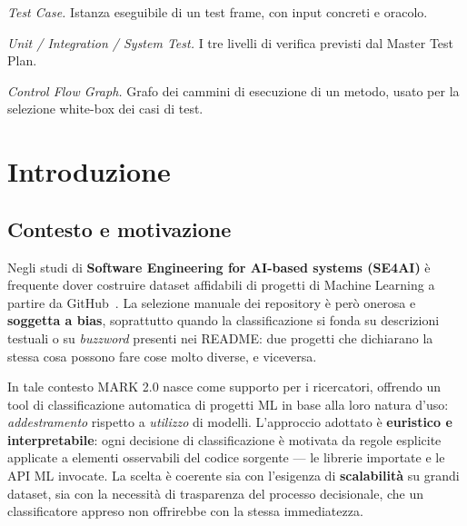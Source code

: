 \documentclass[11pt,a4paper]{article}
\newcommand{\baselineName}{MARK 2.0}
\begin{document}
\begin{description}[style=nextline,leftmargin=2.6cm,labelwidth=2.2cm,
                    font=\normalfont\bfseries]
  \item[TC] \emph{Test Case.} Istanza eseguibile di un test frame, con input
    concreti e oracolo.

  \item[UT / IT / ST] \emph{Unit / Integration / System Test.} I tre livelli di
    verifica previsti dal Master Test Plan.

  \item[CFG] \emph{Control Flow Graph.} Grafo dei cammini di esecuzione di un
    metodo, usato per la selezione white-box dei casi di test.

\end{description}

\clearpage
{}

\section{Introduzione}
\label{sec:intro}

\subsection{Contesto e motivazione}
\label{sec:contesto}

Negli studi di \textbf{Software Engineering for AI-based systems (SE4AI)} \`e
frequente dover costruire dataset affidabili di progetti di Machine Learning a
partire da GitHub~\cite{gonzalezbarahona}. La selezione manuale dei repository
\`e per\`o onerosa e \textbf{soggetta a bias}, soprattutto quando la
classificazione si fonda su descrizioni testuali o su \emph{buzzword} presenti
nei README: due progetti che dichiarano la stessa cosa possono fare cose molto
diverse, e viceversa.

In tale contesto \baselineName{} nasce come supporto per i ricercatori,
offrendo un tool di classificazione automatica di progetti ML in base alla loro
natura d'uso: \emph{addestramento} rispetto a \emph{utilizzo} di modelli.
L'approccio adottato \`e \textbf{euristico e interpretabile}: ogni decisione di
classificazione \`e motivata da regole esplicite applicate a elementi
osservabili del codice sorgente --- le librerie importate e le API ML invocate.
La scelta \`e coerente sia con l'esigenza di \textbf{scalabilit\`a} su grandi
dataset, sia con la necessit\`a di trasparenza del processo decisionale, che un
classificatore appreso non offrirebbe con la stessa immediatezza.
\end{document}
